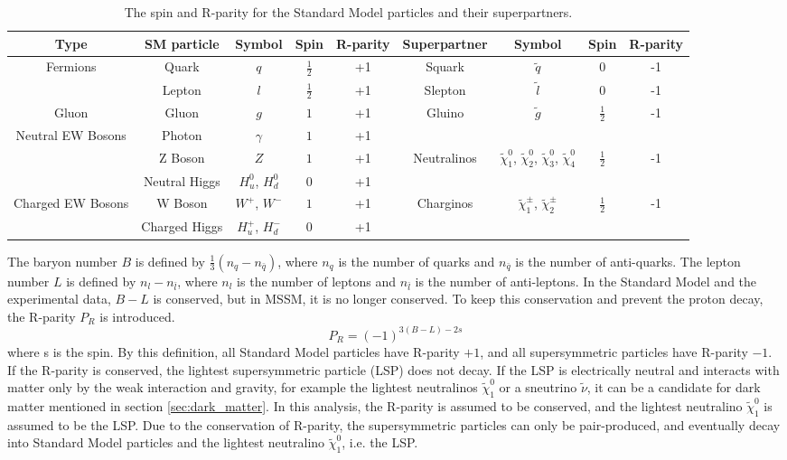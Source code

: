 \begin{table}[htbp]
\tiny
\centering
\begin{tabular}{|c|cccc|cccc|}
\hline
\hline
Type & SM particle & Symbol & Spin & R-parity & Superpartner & Symbol & Spin & R-parity \\
\hline
\hline
Fermions & Quark  & $q$ & $\frac{1}{2}$ & +1 & Squark  & $\tilde{q}$ & 0 & -1 \\
         & Lepton & $l$ & $\frac{1}{2}$ & +1 & Slepton & $\tilde{l}$ & 0 & -1 \\
\hline
Gluon & Gluon  & $g$ & $1$ & +1 & Gluino & $\tilde{g}$ & $\frac{1}{2}$ & -1  \\
\hline
Neutral EW Bosons & Photon         & $\gamma$ & $1$ & +1
                  &  &  &  &  \\
                  & Z Boson        & $Z$      & $1$ & +1
                  & Neutralinos & $\tilde{\chi}_1^0$, $\tilde{\chi}_2^0$, $\tilde{\chi}_3^0$, $\tilde{\chi}_4^0$ & $\frac{1}{2}$ & -1 \\
                  & Neutral Higgs  & $H^0_u$, $H^0_d$  & $0$ & +1
                  &  &  &  &  \\
\hline
Charged EW Bosons & W Boson        & $W^+$, $W^-$  & $1$ & +1
                  & Charginos & $\tilde{\chi}_1^\pm$, $\tilde{\chi}_2^\pm$ & $\frac{1}{2}$ & -1 \\
                  & Charged Higgs  & $H^+_u$, $H^-_d$  & $0$ & +1
                  &  &  &  &  \\
\hline
\hline
\end{tabular}
\caption{The spin and R-parity for the Standard Model particles and their superpartners.}
\label{tab:SUSY_particle}
\end{table}

The baryon number $B$ is defined by $\frac{1}{3} (n_q - n_{\bar{q}})$, where $n_q$ is the number of quarks and $n_{\bar{q}}$ is the number of anti-quarks.
The lepton number $L$ is defined by $n_l - n_{\bar{l}}$, where $n_l$ is the number of leptons and $n_{\bar{l}}$ is the number of anti-leptons.
In the Standard Model and the experimental data, $B-L$ is conserved, but in MSSM, it is no longer conserved.
To keep this conservation and prevent the proton decay, the R-parity $P_R$ is introduced.
\begin{equation}
P_R = (-1)^{3(B-L)-2s}
\end{equation}
where s is the spin.
By this definition, all Standard Model particles have R-parity $+1$, and all supersymmetric particles have R-parity $-1$.
If the R-parity is conserved, the lightest supersymmetric particle (LSP) does not decay.
If the LSP is electrically neutral and interacts with matter only by the weak interaction and gravity, for example the lightest neutralinos $\tilde{\chi}_1^0$ or a sneutrino $\tilde{\nu}$, it can be a candidate for dark matter mentioned in section \ref{sec:dark_matter}.
In this analysis, the R-parity is assumed to be conserved, and the lightest neutralino $\tilde{\chi}_1^0$ is assumed to be the LSP.
Due to the conservation of R-parity, the supersymmetric particles can only be pair-produced, and eventually decay into Standard Model particles and the lightest neutralino $\tilde{\chi}_1^0$, i.e. the LSP.

